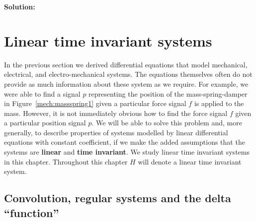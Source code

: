 \documentclass[11pt,a4paper]{book}
\theoremstyle{plain}
\numberwithin{equation}{section}
\newcommand{\term}{\textbf}
\newenvironment{solution}{\begin{footnotesize}\textbf{Solution:}}{\end{footnotesize}}
\newenvironment{excersizelist}{%
  \renewcommand*{\theenumi}{\thechapter.\arabic{enumi}}%
  \newcommand\itemadvanced{\stepcounter{enumi}\item[$\ast$\, \theenumi.]}
  \begin{enumerate}
}{%
  \end{enumerate}
}
\begin{document}
\begin{excersizelist}
\begin{solution}
\end{solution}

\end{excersizelist}


\chapter{Linear time invariant systems}\label{sec:prop-line-time}

In the previous section we derived differential equations that model mechanical, electrical, and electro-mechanical systems.  The equations themselves often do not provide as much information about these system as we require.  For example, we were able to find a signal $p$ representing the position of the mass-spring-damper in Figure~\ref{mech:massspring1} given a particular force signal $f$ is applied to the mass.  However, it is not immediately obvious how to find the force signal $f$ given a particular position signal $p$.  We will be able to solve this problem and, more generally, to describe properties of systems modelled by linear differential equations with constant coefficient, if we make the added assumptions that the systems are \term{linear} and \term{time invariant}.  We study linear time invariant systems in this chapter.  Throughout this chapter $H$ will denote a linear time invariant system.

\section{Convolution, regular systems and the delta ``function''} \label{sec:conv-regul-syst}
\end{document}
